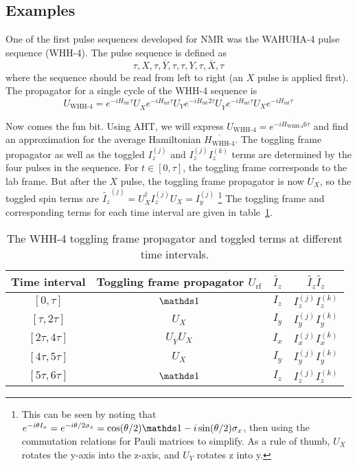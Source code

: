 \subsection{Examples}

One of the first pulse sequences developed for NMR was the WAHUHA-4 pulse sequence (WHH-4).\cite{PhysRevLett.20.180} The pulse sequence is defined as
\begin{equation}
    \tau, X, \tau, \overline{Y}, \tau, \tau, Y, \tau, \overline{X}, \tau
\end{equation}
where the sequence should be read from left to right (an $X$ pulse is applied first). The propagator for a single cycle of the WHH-4 sequence is
\[
U_{\text{WHH-4}} =
    e^{-i H_{\text{int}} \tau} U_{\overline{X}}
    e^{-i H_{\text{int}} \tau} U_Y
    e^{-i H_{\text{int}} 2\tau} U_{\overline{Y}}
    e^{-i H_{\text{int}} \tau} U_X
    e^{-i H_{\text{int}} \tau}
\]

Now comes the fun bit. Using AHT, we will express $U_{\text{WHH-4}} = e^{-i \overline{H_{\text{WHH-4}}} 6\tau}$ and find an approximation for the average Hamiltonian $\overline{H_{\text{WHH-4}}}$. The toggling frame propagator as well as the toggled $I_z^{(j)}$ and $I_z^{(j)}I_z^{(k)}$ terms are determined by the four pulses in the sequence. For $t \in [0, \tau]$, the toggling frame corresponds to the lab frame.
But after the $X$ pulse, the toggling frame propagator is now $U_X$, so the toggled spin terms are $\widetilde{I_z}^{(j)} = U_X^\dagger I_z^{(j)} U_X = I_y^{(j)}$
\footnote{
This can be seen by noting that $e^{-i \theta I_x} = e^{-i \theta/2 \sigma_x} = \cos(\theta/2) \identity - i\sin(\theta/2) \sigma_x$, then using the commutation relations for Pauli matrices to simplify. As a rule of thumb, $U_X$ rotates the y-axis into the z-axis, and $U_Y$ rotates z into y.
}
The toggling frame and corresponding terms for each time interval are given in table~\ref{tab:WHH-4}.

\begin{table}[H]
    \centering
    \caption{The WHH-4 toggling frame propagator and toggled terms at different time intervals.}
    \label{tab:WHH-4}
    \begin{tabular}{c c c c}
        Time interval & Toggling frame propagator $U_{\text{rf}}$ & $\widetilde{I_z}$ & $\widetilde{I_z}\widetilde{I_z}$ \\
        \hline
        $[0, \tau]$ & $\identity$ & $I_z$ & $I_z^{(j)}I_z^{(k)}$ \\
        $[\tau, 2\tau]$ & $U_X$ & $I_y$ & $I_y^{(j)}I_y^{(k)}$ \\
        $[2\tau, 4\tau]$ & $U_{\overline{Y}} U_X$ & $I_x$ & $I_x^{(j)}I_x^{(k)}$ \\
        $[4\tau, 5\tau]$ & $U_X$ & $I_y$ & $I_y^{(j)}I_y^{(k)}$ \\
        $[5\tau, 6\tau]$ & $\identity$ & $I_z$ & $I_z^{(j)}I_z^{(k)}$ \\
    \end{tabular}
\end{table}

